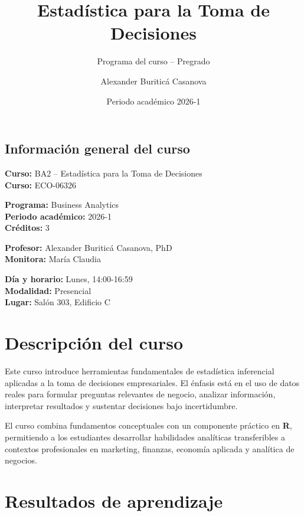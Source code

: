 \documentclass[
  11pt,
]{article}
\title{Estadística para la Toma de Decisiones}
\subtitle{Programa del curso -- Pregrado}
\author{Alexander Buriticá Casanova}
\date{Periodo académico 2026-1}
\begin{document}
\maketitle

\hypertarget{informaciuxf3n-general-del-curso}{%
\subsection{Información general del
curso}\label{informaciuxf3n-general-del-curso}}

\textbf{Curso:} BA2 -- Estadística para la Toma de Decisiones\\
\textbf{Curso:} ECO-06326

\textbf{Programa:} Business Analytics\\
\textbf{Periodo académico:} 2026-1\\
\textbf{Créditos:} 3

\textbf{Profesor:} Alexander Buriticá Casanova, PhD\\
\textbf{Monitora:} María Claudia

\textbf{Día y horario:} Lunes, 14:00-16:59\\
\textbf{Modalidad:} Presencial\\
\textbf{Lugar:} Salón 303, Edificio C

\hypertarget{descripciuxf3n-del-curso}{%
\section{Descripción del curso}\label{descripciuxf3n-del-curso}}

Este curso introduce herramientas fundamentales de estadística
inferencial aplicadas a la toma de decisiones empresariales. El énfasis
está en el uso de datos reales para formular preguntas relevantes de
negocio, analizar información, interpretar resultados y sustentar
decisiones bajo incertidumbre.

El curso combina fundamentos conceptuales con un componente práctico en
\textbf{R}, permitiendo a los estudiantes desarrollar habilidades
analíticas transferibles a contextos profesionales en marketing,
finanzas, economía aplicada y analítica de negocios.

\hypertarget{resultados-de-aprendizaje}{%
\section{Resultados de aprendizaje}\label{resultados-de-aprendizaje}}
\end{document}
